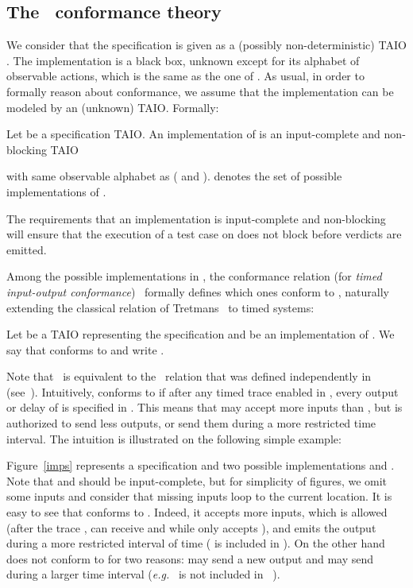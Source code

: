 \documentclass{LMCS}
\theoremstyle{plain}\newtheorem{proposition}[thm]{Proposition}
\def\eg{{\em e.g.}}
\begin{document}
\subsection{The \tioco~conformance theory}
We consider that the specification is given as a  (possibly
non-deterministic) TAIO .
The implementation is a black box, unknown
except for its alphabet of observable actions, which is the same as
the one of .  
As usual, in order to formally
reason about conformance, we assume that the implementation can be
modeled by an (unknown) TAIO.
Formally:
\begin{defi}[Implementation]
Let  be a specification TAIO.
An implementation of  is an input-complete and non-blocking TAIO

with same observable alphabet as  ( and ).
 denotes the set of possible implementations of .
\end{defi}

The requirements that an implementation is input-complete and non-blocking
will ensure that the execution of a test case on  does not
block before verdicts are emitted.  


Among the possible implementations in , 
the conformance relation  (for {\em timed input-output conformance})~\cite{KrichenTripakis09} 
formally defines which ones conform to ,
naturally extending the classical  relation of Tretmans~\cite{Tretmans-SCT96} to timed
systems:
\begin{defi}
Let  be a TAIO representing the specification and  be an implementation of . We say that  conforms to  and write
.
\end{defi}

Note that \tioco\, is equivalent to the \rtioco\, relation  that was defined
independently in~\cite{Larsen-Mikucionis-Nielsen-2004} (see~\cite{DBLP:conf/formats/SchmaltzT08}).
Intuitively,  conforms to  if after any timed trace enabled
in , every output or delay of  is specified in . 
This means that  may accept more inputs than ,
but is authorized to send less outputs, 
or send them during a more restricted time interval. 
The intuition is illustrated on the following simple example:

\begin{exa}
Figure~\ref{imps} represents a specification  and two possible 
implementations  and .
Note that  and  should be input-complete, but for simplicity of figures, 
we omit some inputs and consider that missing inputs loop 
to the current location. It is easy to see that  conforms to .
Indeed, it accepts more inputs, which is allowed
(after the trace ,  can receive  and 
while  only accepts ), 
and emits the output  during a more restricted interval 
of time ( is included in ).
On the other hand  does not conform to  for 
two reasons:
  may send a new output  
and may send  during a larger time interval 
(\eg~
is not included in ~). 
\end{exa}
\end{document}
